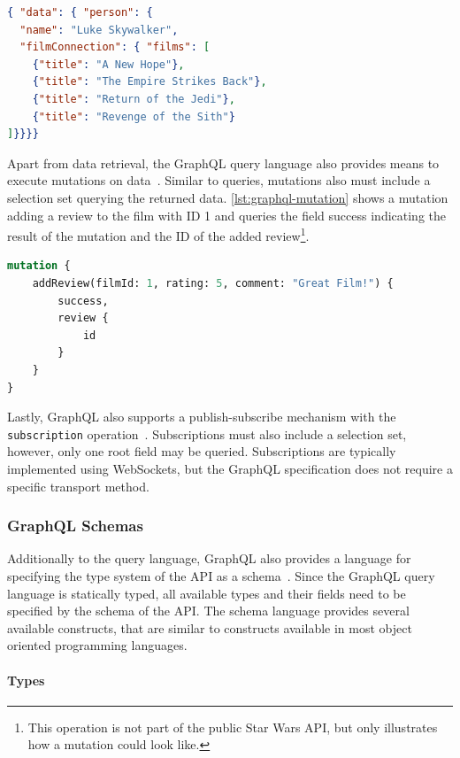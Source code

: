 \begin{lstlisting}[language=json, caption={SWAPI GraphQL Response}, label={lst:graphql-response}]
{ "data": { "person": {
  "name": "Luke Skywalker",
  "filmConnection": { "films": [
    {"title": "A New Hope"},
    {"title": "The Empire Strikes Back"},
    {"title": "Return of the Jedi"},
    {"title": "Revenge of the Sith"}
]}}}}
\end{lstlisting}

Apart from data retrieval, the GraphQL query language also provides means to execute mutations on data~\cite{Facebook2018}.
Similar to queries, mutations also must include a selection set querying the returned data.
\autoref{lst:graphql-mutation} shows a mutation adding a review to the film with ID 1 and queries the field success indicating the result of the mutation and the ID of the added review\footnote{This operation is not part of the public Star Wars \ac{API}, but only illustrates how a mutation could look like.}.

\begin{lstlisting}[language=graphql, caption={GraphQL Mutations}, label={lst:graphql-mutation}]
mutation {
    addReview(filmId: 1, rating: 5, comment: "Great Film!") {
        success,
        review {
            id
        }
    }
}    
\end{lstlisting}

Lastly, GraphQL also supports a publish-subscribe mechanism with the \texttt{subscription} operation~\cite{Facebook2018}.
Subscriptions must also include a selection set, however, only one root field may be queried.
Subscriptions are typically implemented using WebSockets, but the GraphQL specification does not require a specific transport method.

\subsubsection{GraphQL Schemas}\label{sec:graphql-schemas}

Additionally to the query language, GraphQL also provides a language for specifying the type system of the \ac{API} as a schema~\cite{Diaz2020}.
Since the GraphQL query language is statically typed, all available types and their fields need to be specified by the schema of the \ac{API}.
The schema language provides several available constructs, that are similar to constructs available in most object oriented programming languages.

\paragraph{Types}

